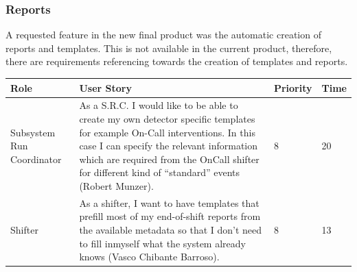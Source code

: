 \documentclass[paper=a4, fontsize=11pt,twoside]{scrartcl}	%
\begin{document}
\subsubsection{Reports}
A requested feature in the new final product was the automatic creation of reports and templates. This is not available in the current product, therefore, there are requirements referencing towards the creation of templates and reports.
\begin{longtable}{ | p{3cm} | p{8cm} | p{1.5cm} | l |}
\hline
Role & User Story & Priority & Time \\ \hline
Subsystem Run Coordinator & As a S.R.C. I would like to be able to create my own detector specific templates for example On-Call interventions. In this case I can specify the relevant information which are required from the OnCall shifter for different kind of “standard” events (Robert Munzer). & 8 & 20 \\ \hline
Shifter &  As a shifter, I want to have templates that prefill most of my end-of-shift reports from the available metadata so that I don’t need to fill inmyself what the system already knows (Vasco Chibante Barroso). & 8 & 13 \\ \hline
\end{longtable}
\end{document}

